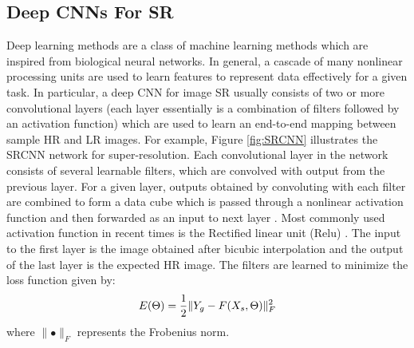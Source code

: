 \documentclass{article}
\def\sqz{\vspace{-3pt}}
\begin{document}
\subsection{Deep CNNs For SR}
Deep learning methods are a class of machine learning methods which are inspired from biological neural networks. In general, a cascade of many nonlinear processing units are used to learn features to represent data effectively for a  given task. In particular, a deep CNN for image SR usually consists of two or more convolutional layers (each layer essentially is a combination of filters followed by an activation function) which are used to learn an end-to-end  mapping between sample HR and LR images. For example, Figure \ref{fig:SRCNN} illustrates the SRCNN network \cite{dong2016image, yang2016super} for super-resolution. Each convolutional layer in the network consists of several learnable filters, which are convolved with output from the previous layer. For a given layer, outputs obtained by convoluting with each filter are combined to form a data cube which is passed through a nonlinear activation function and then forwarded as an input to next layer \cite{lecun2015deep}. Most commonly used activation function in recent times is the Rectified linear unit (Relu) \cite{glorot2011deep}. The input to the first layer is the image obtained after bicubic interpolation and the output of the last layer is the expected HR image. The filters are learned to minimize the loss function given by:\sqz\sqz\sqz
\begin{equation}\label{eq1}
E(\Theta) = \frac{1}{2}\|Y_{g} - F(X_{s}, \Theta)\|_{F}^{2}\sqz\sqz\sqz
\end{equation}
where $\parallel\bullet\|_{F}$ represents the Frobenius norm.
\sqz\sqz
\end{document}
